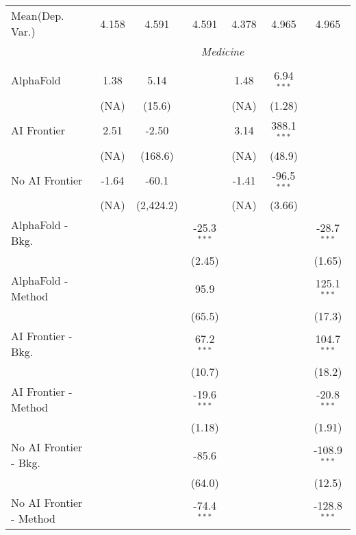 \begin{tabular}{lcccccc}
Mean(Dep. Var.) & 4.158 & 4.591 & 4.591 & 4.378 & 4.965 & 4.965 \\
 & \multicolumn{6}{c}{\textit{Medicine}} \\ \\
   AlphaFold               & 1.38  & 5.14      &               & 1.48  & 6.94$^{***}$  &   \\   
                           & (NA)  & (15.6)    &               & (NA)  & (1.28)        &   \\   
   AI Frontier             & 2.51  & -2.50     &               & 3.14  & 388.1$^{***}$ &   \\   
                           & (NA)  & (168.6)   &               & (NA)  & (48.9)        &   \\   
   No AI Frontier          & -1.64 & -60.1     &               & -1.41 & -96.5$^{***}$ &   \\   
                           & (NA)  & (2,424.2) &               & (NA)  & (3.66)        &   \\   
   AlphaFold - Bkg.        &       &           & -25.3$^{***}$ &       &               & -28.7$^{***}$\\   
                           &       &           & (2.45)        &       &               & (1.65)\\   
   AlphaFold - Method      &       &           & 95.9          &       &               & 125.1$^{***}$\\   
                           &       &           & (65.5)        &       &               & (17.3)\\   
   AI Frontier - Bkg.      &       &           & 67.2$^{***}$  &       &               & 104.7$^{***}$\\   
                           &       &           & (10.7)        &       &               & (18.2)\\   
   AI Frontier - Method    &       &           & -19.6$^{***}$ &       &               & -20.8$^{***}$\\   
                           &       &           & (1.18)        &       &               & (1.91)\\   
   No AI Frontier - Bkg.   &       &           & -85.6         &       &               & -108.9$^{***}$\\   
                           &       &           & (64.0)        &       &               & (12.5)\\   
   No AI Frontier - Method &       &           & -74.4$^{***}$ &       &               & -128.8$^{***}$\\   

\end{tabular}

